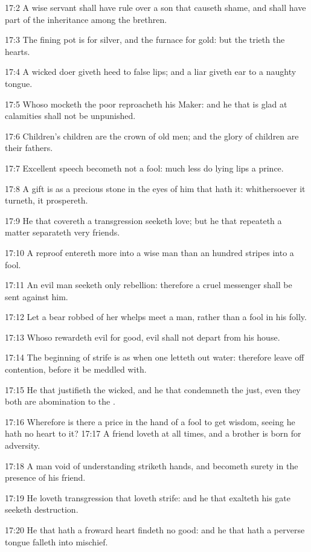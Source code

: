 17:2 A wise servant shall have rule over a son that causeth shame, and
shall have part of the inheritance among the brethren.

17:3 The fining pot is for silver, and the furnace for gold: but the
\LORD trieth the hearts.

17:4 A wicked doer giveth heed to false lips; and a liar giveth ear to
a naughty tongue.

17:5 Whoso mocketh the poor reproacheth his Maker: and he that is glad
at calamities shall not be unpunished.

17:6 Children's children are the crown of old men; and the glory of
children are their fathers.

17:7 Excellent speech becometh not a fool: much less do lying lips a
prince.

17:8 A gift is as a precious stone in the eyes of him that hath it:
whithersoever it turneth, it prospereth.

17:9 He that covereth a transgression seeketh love; but he that
repeateth a matter separateth very friends.

17:10 A reproof entereth more into a wise man than an hundred stripes
into a fool.

17:11 An evil man seeketh only rebellion: therefore a cruel messenger
shall be sent against him.

17:12 Let a bear robbed of her whelps meet a man, rather than a fool
in his folly.

17:13 Whoso rewardeth evil for good, evil shall not depart from his
house.

17:14 The beginning of strife is as when one letteth out water:
therefore leave off contention, before it be meddled with.

17:15 He that justifieth the wicked, and he that condemneth the just,
even they both are abomination to the \LORD.

17:16 Wherefore is there a price in the hand of a fool to get wisdom,
seeing he hath no heart to it?  17:17 A friend loveth at all times,
and a brother is born for adversity.

17:18 A man void of understanding striketh hands, and becometh surety
in the presence of his friend.

17:19 He loveth transgression that loveth strife: and he that exalteth
his gate seeketh destruction.

17:20 He that hath a froward heart findeth no good: and he that hath a
perverse tongue falleth into mischief.

